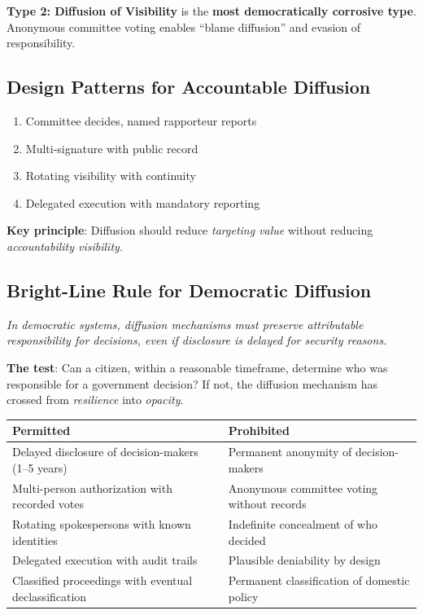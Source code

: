 \documentclass[11pt,letterpaper]{article}
\begin{document}
\begin{warnbox}
\textbf{Type 2: Diffusion of Visibility} is the \textbf{most democratically corrosive type}. Anonymous committee voting enables ``blame diffusion'' and evasion of responsibility.
\end{warnbox}

\subsection{Design Patterns for Accountable Diffusion}

\begin{enumerate}[nosep]
  \item Committee decides, named rapporteur reports
  \item Multi-signature with public record
  \item Rotating visibility with continuity
  \item Delegated execution with mandatory reporting
\end{enumerate}

\textbf{Key principle}: Diffusion should reduce \textit{targeting value} without reducing \textit{accountability visibility}.

\subsection{Bright-Line Rule for Democratic Diffusion}

\begin{recbox}
\textit{In democratic systems, diffusion mechanisms must preserve attributable responsibility for decisions, even if disclosure is delayed for security reasons.}

\textbf{The test}: Can a citizen, within a reasonable timeframe, determine who was responsible for a government decision? If not, the diffusion mechanism has crossed from \textit{resilience} into \textit{opacity}.
\end{recbox}

\begin{center}
\footnotesize
\begin{tabular}{L{6cm}L{6cm}}
\toprule
\textbf{Permitted} & \textbf{Prohibited} \\
\midrule
Delayed disclosure of decision-makers (1--5 years) & Permanent anonymity of decision-makers \\
Multi-person authorization with recorded votes & Anonymous committee voting without records \\
Rotating spokespersons with known identities & Indefinite concealment of who decided \\
Delegated execution with audit trails & Plausible deniability by design \\
Classified proceedings with eventual declassification & Permanent classification of domestic policy \\
\bottomrule
\end{tabular}
\end{center}
\end{document}
